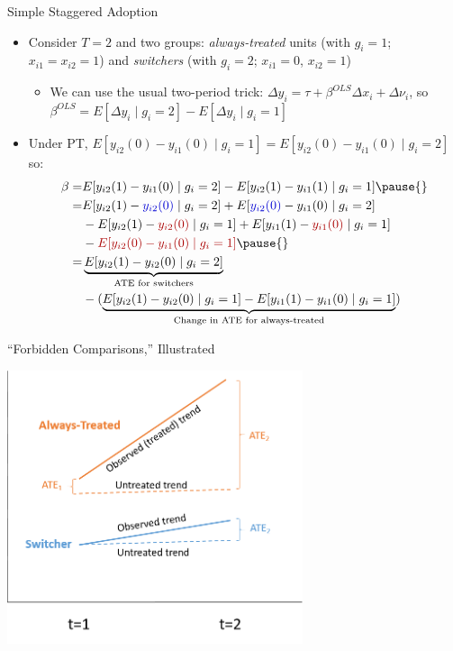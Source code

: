 \documentclass[11pt,english]{beamer}
\begin{document}
\begin{frame}{Simple Staggered Adoption}
\vspace{0.2cm}
\begin{itemize}
\item Consider $T=2$ and two groups: \emph{always-treated} units (with $g_i=1$; $x_{i1}=x_{i2}=1$) and \emph{switchers} (with $g_i=2$; $x_{i1}=0$, $x_{i2}=1$)\smallskip\pause{}
\begin{itemize}
\item We can use the usual two-period trick: $\Delta y_i = \tau + \beta^{OLS} \Delta x_i + \Delta \nu_i$, so $\beta^{OLS} = E[\Delta y_i\mid g_i=2]-E[\Delta y_i\mid g_i=1]$
\end{itemize}\bigskip\pause{}

\item Under PT, $E[y_{i2}(0)-y_{i1}(0)\mid g_i=1]=E[y_{i2}(0)-y_{i1}(0)\mid g_i=2]$ so:\smallskip
\begin{align*}
\beta  =& E[y_{i2}(1)-y_{i1}(0)\mid g_i=2]-E[y_{i2}(1)-y_{i1}(1)\mid g_i=1]\pause{} \\
=&E[y_{i2}(1)-{\color{blue}{y_{i2}(0)}}\mid g_i=2] + E[{\color{blue}{y_{i2}(0)}}-y_{i1}(0)\mid g_i=2]\\
& - E[y_{i2}(1)- {\color{red}{y_{i2}(0)}} \mid g_i=1] + E[y_{i1}(1)- {\color{red}{y_{i1}(0)}}\mid g_i=1]  \\
& -{\color{red}{E[y_{i2}(0)}-y_{i1}(0)\mid g_i=1]} \pause{}\\
=& \underbrace{E[y_{i2}(1)-y_{i2}(0)\mid g_i=2]}_{\text{ATE for switchers}} \\
&-(\underbrace{E[y_{i2}(1)- y_{i2}(0) \mid g_i=1] - E[y_{i1}(1)- y_{i1}(0)\mid g_i=1]}_{\text{Change in ATE for always-treated}} )
\end{align*}
\end{itemize}

\end{frame}

\begin{frame}{``Forbidden Comparisons,'' Illustrated}

\vspace{0.7cm}
\begin{center}
	\includegraphics[width=0.65\textwidth]{figures/GB_1.png}
\end{center}

\end{frame}
\end{document}
